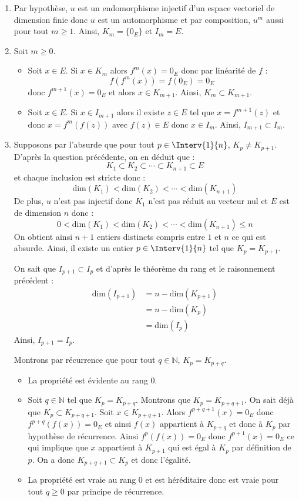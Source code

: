 \documentclass[a4paper,10pt]{report}
\begin{document}
\corr \begin{enumerate}
\item Par hypothèse, $u$ est un endomorphisme injectif d'un espace vectoriel de dimension finie donc $u$ est un automorphisme et par composition, $u^m$ aussi pour tout $m \geq 1$. Ainsi, $K_m =\lbrace 0_E \rbrace$ et $I_m = E$.
\item Soit $m \geq 0$.
\begin{itemize}
\item Soit $x \in E$. Si $x \in K_m$ alors $f^m(x)=0_E$ donc par linéarité de $f$ :
$$ f(f^m(x))=f(0_E)=0_E$$
donc $f^{m+1}(x)=0_E$ et alors $x \in K_{m+1}$. Ainsi, $K_m \subset K_{m+1}$.
\item Soit $x \in E$. Si $x \in I_{m+1}$ alors il existe $z \in E$ tel que $x = f^{m+1}(z)$ et donc $x= f^m(f(z))$ avec $f(z) \in E$ donc $x \in I_m$. Ainsi, $I_{m+1} \subset I_m$.
\end{itemize}

\item Supposons par l'absurde que pour tout $p \in \Interv{1}{n}$, $K_p \neq K_{p+1}$. D'après la question précédente, on en déduit que :
$$  K_1 \subset K_2 \subset \cdots \subset K_{n+1} \subset E$$
et chaque inclusion est stricte donc :
$$  \textrm{dim}(K_1) < \textrm{dim}(K_2) < \cdots < \textrm{dim}(K_{n+1})$$
De plus, $u$ n'est pas injectif donc $K_1$ n'est pas réduit au vecteur nul et $E$ est de dimension $n$ donc :
$$  0< \textrm{dim}(K_1) < \textrm{dim}(K_2) < \cdots < \textrm{dim}(K_{n+1}) \leq n$$
On obtient ainsi $n+1$ entiers distincts compris entre $1$ et $n$ ce qui est absurde. Ainsi, il existe un entier $p \in \Interv{1}{n}$ tel que $K_p=K_{p+1}$. 

\medskip

\noindent On sait que $I_{p+1} \subset I_{p}$ et d'après le théorème du rang et le raisonnement précédent :
\begin{align*}
 \textrm{dim}(I_{p+1}) & = n - \textrm{dim}(K_{p+1})  \\
 &  = n - \textrm{dim}(K_{p})  \\
 & =  \textrm{dim}(I_{p})
 \end{align*}
 Ainsi, $I_{p+1}=I_p$.


\medskip

\noindent Montrons par récurrence que pour tout $q \in \mathbb{N}$, $K_p = K_{p+q}$.
\begin{itemize}
\item La propriété est évidente au rang $0$. 
\item Soit $q \in \mathbb{N}$ tel que $K_p= K_{p+q}$. Montrons que $K_p=K_{p+q+1}$. On sait déjà que $K_p \subset K_{p+q+1}$. Soit $x \in  K_{p+q+1}$. Alors $f^{p+q+1}(x)=0_E$ donc $f^{p+q}(f(x))=0_E$ et ainsi $f(x)$ appartient à $K_{p+q}$ et donc à $K_p$ par hypothèse de récurrence. Ainsi $f^{p}(f(x))=0_E$ donc $f^{p+1}(x)=0_E$ ce qui implique que $x$ appartient à $K_{p+1}$ qui est égal à $K_p$ par définition de $p$. On a donc $K_{p+q+1} \subset K_p$ et donc l'égalité.
\item La propriété est vraie au rang $0$ et est héréditaire donc est vraie pour tout $q \geq 0$ par principe de récurrence.
\end{itemize}


\end{enumerate}
\end{document}
